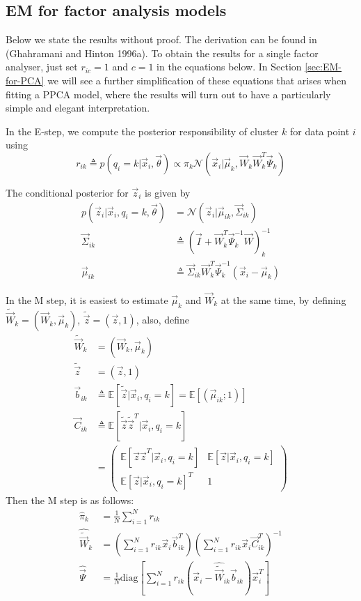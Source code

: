 \subsection{EM for factor analysis models}
Below we state the results without proof. The derivation can be found in (Ghahramani and Hinton 1996a). To obtain the results for a single factor analyser, just set $r_{ic} =1$ and $c=1$ in the equations below. In Section \ref{sec:EM-for-PCA} we will see a further simplification of these equations that arises when fitting a PPCA model, where the results will turn out to have a particularly simple and elegant interpretation.

In the E-step, we compute the posterior responsibility of cluster $k$ for data point $i$ using
\begin{equation}
r_{ik} \triangleq p(q_i=k|\vec{x}_i,\vec{\theta}) \propto \pi_k\mathcal{N}(\vec{x}_i|\vec{\mu}_k,\vec{W}_k\vec{W}_k^T\vec{\Psi}_k)
\end{equation}

The conditional posterior for $\vec{z}_i$ is given by
\begin{align}
p(\vec{z}_i|\vec{x}_i,q_i=k,\vec{\theta}) & = \mathcal{N}(\vec{z}_i|\vec{\mu}_{ik},\vec{\Sigma}_{ik}) \\
\vec{\Sigma}_{ik} & \triangleq (\vec{I}+\vec{W}_k^T\vec{\Psi}_k^{-1}\vec{W})_k^{-1} \\
\vec{\mu}_{ik} & \triangleq \vec{\Sigma}_{ik}\vec{W}_k^T\vec{\Psi}_k^{-1}(\vec{x}_i-\vec{\mu}_k)
\end{align}

In the M step, it is easiest to estimate $\vec{\mu}_k$ and $\vec{W}_k$ at the same time, by defining $\tilde{\vec{W}}_k=(\vec{W}_k,\vec{\mu}_k)$, $\tilde{\vec{z}}=(\vec{z},1)$, also, define
\begin{align}
\tilde{\vec{W}}_k & =(\vec{W}_k,\vec{\mu}_k) \\
\tilde{\vec{z}} & =(\vec{z},1) \\
\vec{b}_{ik} & \triangleq \mathbb{E}[\tilde{\vec{z}}|\vec{x}_i,q_i=k]=\mathbb{E}[(\vec{\mu}_{ik};1)] \\
\vec{C}_{ik} & \triangleq \mathbb{E}[\tilde{\vec{z}}\tilde{\vec{z}}^T|\vec{x}_i,q_i=k] \\
    & =\left(\begin{array}{cc}
\mathbb{E}[\vec{z}\vec{z}^T|\vec{x}_i,q_i=k] & \mathbb{E}[\vec{z}|\vec{x}_i,q_i=k] \\
\mathbb{E}[\vec{z}|\vec{x}_i,q_i=k]^T & 1
\end{array}\right)
\end{align}
Then the M step is as follows:
\begin{align}
\hat{\pi}_k & = \frac{1}{N}\sum\limits_{i=1}^N r_{ik} \\
\hat{\tilde{\vec{W}}}_k & = \left(\sum\limits_{i=1}^N r_{ik}\vec{x}_i\vec{b}_{ik}^T\right)\left(\sum\limits_{i=1}^N r_{ik}\vec{x}_i\vec{C}_{ik}^T\right)^{-1} \label{eqn:FA-EM-W} \\
\hat{\vec{\Psi}} & = \frac{1}{N}\mathrm{diag}\left[\sum\limits_{i=1}^N r_{ik}(\vec{x}_i-\hat{\tilde{\vec{W}}}_{ik}\vec{b}_{ik})\vec{x}_i^T\right]
\end{align}

